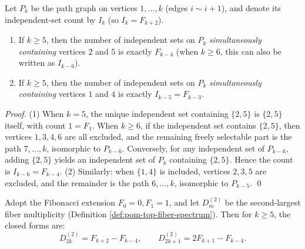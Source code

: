 \begin{lemma}\label{lem:pom-forbidden-pair-fib-gap}
Let \(P_k\) be the path graph on vertices \(1,\dots,k\) (edges \(i\!\sim\! i{+}1\)), and denote its independent-set count by \(I_k\) (so \(I_k=F_{k+2}\)).
\begin{enumerate}
  \item If \(k\ge 5\), then the number of independent sets on \(P_k\) \emph{simultaneously containing} vertices \(2\) and \(5\) is exactly \(F_{k-4}\) (when \(k\ge 6\), this can also be written as \(I_{k-6}\)).
  \item If \(k\ge 5\), then the number of independent sets on \(P_k\) \emph{simultaneously containing} vertices \(1\) and \(4\) is exactly \(I_{k-5}=F_{k-3}\).
\end{enumerate}
\end{lemma}
\begin{proof}
(1) When \(k=5\), the unique independent set containing \(\{2,5\}\) is \(\{2,5\}\) itself, with count \(1=F_1\).
When \(k\ge 6\), if the independent set contains \(\{2,5\}\), then vertices \(1,3,4,6\) are all excluded, and the remaining freely selectable part is the path \(7,\dots,k\), isomorphic to \(P_{k-6}\). Conversely, for any independent set of \(P_{k-6}\), adding \(\{2,5\}\) yields an independent set of \(P_k\) containing \(\{2,5\}\). Hence the count is \(I_{k-6}=F_{k-4}\).\;
(2) Similarly: when \(\{1,4\}\) is included, vertices \(2,3,5\) are excluded, and the remainder is the path \(6,\dots,k\), isomorphic to \(P_{k-5}\). \qed
\end{proof}
\begin{theorem}\label{thm:pom-second-max-fiber-closed-form}
Adopt the Fibonacci extension \(F_0=0,F_1=1\), and let \(D_m^{(2)}\) be the second-largest fiber multiplicity (Definition \ref{def:pom-top-fiber-spectrum}).
Then for \(k\ge 5\), the closed forms are:
\[
D_{2k}^{(2)} = F_{k+2}-F_{k-4},
\qquad
D_{2k+1}^{(2)} = 2F_{k+1}-F_{k-4}.
\]
\end{theorem}
